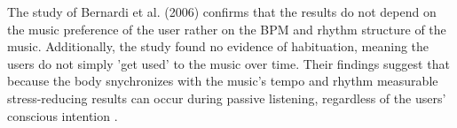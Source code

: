 The study of Bernardi et al. (2006) confirms that the results do not depend on the music preference of the user rather on the BPM and rhythm structure of the music. Additionally, the study found no evidence of habituation, meaning the users do not simply 'get used' to the music over time.
Their findings suggest that because the body snychronizes with the music's tempo and rhythm measurable stress-reducing results can occur during passive listening, regardless of the users' conscious intention \cite{bernardi2006cardiovascular}.



